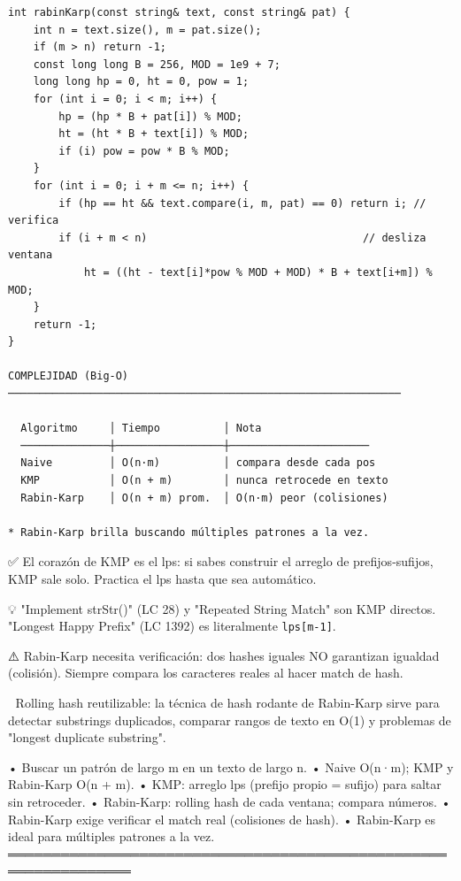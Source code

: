\begin{lstlisting}
int rabinKarp(const string& text, const string& pat) {
    int n = text.size(), m = pat.size();
    if (m > n) return -1;
    const long long B = 256, MOD = 1e9 + 7;
    long long hp = 0, ht = 0, pow = 1;
    for (int i = 0; i < m; i++) {
        hp = (hp * B + pat[i]) % MOD;
        ht = (ht * B + text[i]) % MOD;
        if (i) pow = pow * B % MOD;
    }
    for (int i = 0; i + m <= n; i++) {
        if (hp == ht && text.compare(i, m, pat) == 0) return i; // verifica
        if (i + m < n)                                  // desliza ventana
            ht = ((ht - text[i]*pow % MOD + MOD) * B + text[i+m]) % MOD;
    }
    return -1;
}

COMPLEJIDAD (Big-O)
──────────────────────────────────────────────────────────────

  Algoritmo     │ Tiempo          │ Nota
  ──────────────┼─────────────────┼──────────────────────
  Naive         │ O(n·m)          │ compara desde cada pos
  KMP           │ O(n + m)        │ nunca retrocede en texto
  Rabin-Karp    │ O(n + m) prom.  │ O(n·m) peor (colisiones)

* Rabin-Karp brilla buscando múltiples patrones a la vez.
\end{lstlisting}

\begin{dsaentrevistas}

✅ El corazón de KMP es el lps: si sabes construir el arreglo de
   prefijos-sufijos, KMP sale solo. Practica el lps hasta que sea
   automático.

💡 "Implement strStr()" (LC 28) y "Repeated String Match" son KMP
   directos. "Longest Happy Prefix" (LC 1392) es literalmente
   \verb|lps[m-1]|.

⚠️ Rabin-Karp necesita verificación: dos hashes iguales NO garantizan
   igualdad (colisión). Siempre compara los caracteres reales al hacer
   match de hash.

🔑 Rolling hash reutilizable: la técnica de hash rodante de Rabin-Karp
   sirve para detectar substrings duplicados, comparar rangos de texto en
   O(1) y problemas de "longest duplicate substring".

\end{dsaentrevistas}

\begin{dsaresumen}

• Buscar un patrón de largo m en un texto de largo n.
• Naive O(n·m); KMP y Rabin-Karp O(n + m).
• KMP: arreglo lps (prefijo propio = sufijo) para saltar sin retroceder.
• Rabin-Karp: rolling hash de cada ventana; compara números.
• Rabin-Karp exige verificar el match real (colisiones de hash).
• Rabin-Karp es ideal para múltiples patrones a la vez.
════════════════════════════════════════════════════════════════

\end{dsaresumen}
